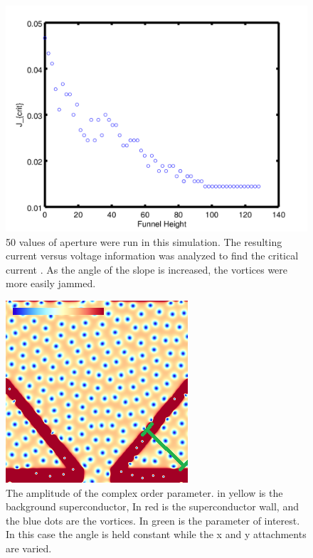 \begin{figure}[htbp]
\begin{center}
\includegraphics[scale=.50]{funnelY.png}
\caption{ 50 values of aperture were run in this simulation. The resulting current versus voltage information was analyzed to find the critical current . As the angle of the slope is increased, the vortices were more easily jammed. }
\label{normalYscan}
\end{center}
\end{figure}


\begin{figure}[htbp]
\begin{center}
\includegraphics[scale=.50]{normalAngle.png}
\caption{ The amplitude of the complex order parameter. in yellow is the background superconductor, In red is the superconductor wall, and the blue dots are the vortices. In green is the parameter of interest. In this case the angle is held constant while the x and y attachments are varied. }
\label{normalAngle}
\end{center}
\end{figure}

